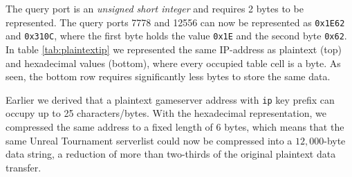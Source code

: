 The query port is an \emph{unsigned short integer} and requires 2 bytes to be represented. The query ports 7778 and 12556 can now be represented as {\tt 0x1E62} and {\tt 0x310C}, where the first byte holds the value {\tt 0x1E} and the second byte {\tt 0x62}. In table \ref{tab:plaintextip} we represented the same IP-address as plaintext (top) and hexadecimal values (bottom), where every occupied table cell is a byte. As seen, the bottom row requires significantly less bytes to store the same data.

Earlier we derived that a plaintext gameserver address with {\tt ip} key prefix can occupy up to 25 characters/bytes. With the hexadecimal representation, we compressed the same address to a fixed length of 6 bytes, which means that the same Unreal Tournament serverlist could now be compressed into a $12,000$-byte data string, a reduction of more than two-thirds of the original plaintext data transfer.
